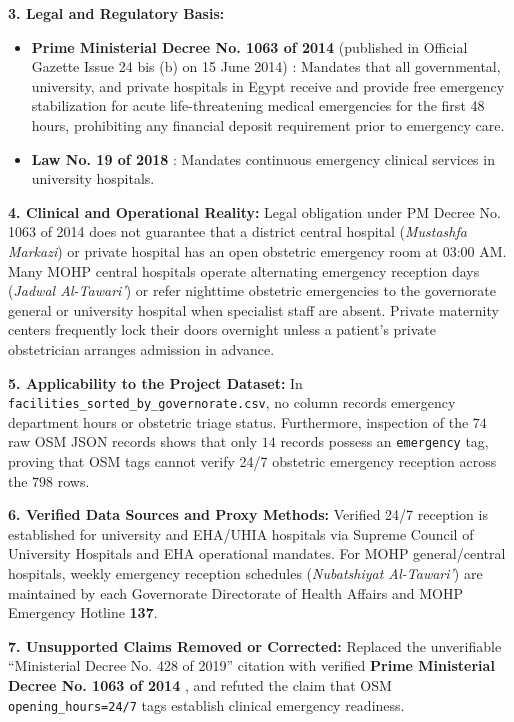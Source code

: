 \documentclass[10pt,a4paper]{article}
\begin{document}
\textbf{3. Legal and Regulatory Basis:}
\begin{itemize}
    \item \textbf{Prime Ministerial Decree No. 1063 of 2014} (published in Official Gazette Issue 24 bis (b) on 15 June 2014) \cite{egypt_pm_decree_1063_2014}: Mandates that all governmental, university, and private hospitals in Egypt receive and provide free emergency stabilization for acute life-threatening medical emergencies for the first 48 hours, prohibiting any financial deposit requirement prior to emergency care.
    \item \textbf{Law No. 19 of 2018} \cite{egypt_law_19_2018_univ}: Mandates continuous emergency clinical services in university hospitals.
\end{itemize}

\textbf{4. Clinical and Operational Reality:}
Legal obligation under PM Decree No. 1063 of 2014 does not guarantee that a district central hospital (\textit{Mustashfa Markazi}) or private hospital has an open obstetric emergency room at 03:00 AM. Many MOHP central hospitals operate alternating emergency reception days (\textit{Jadwal Al-Tawari'}) or refer nighttime obstetric emergencies to the governorate general or university hospital when specialist staff are absent. Private maternity centers frequently lock their doors overnight unless a patient's private obstetrician arranges admission in advance.

\textbf{5. Applicability to the Project Dataset:}
In \texttt{facilities\_sorted\_by\_governorate.csv}, no column records emergency department hours or obstetric triage status. Furthermore, inspection of the $74$ raw OSM JSON records shows that only $14$ records possess an \texttt{emergency} tag, proving that OSM tags cannot verify 24/7 obstetric emergency reception across the $798$ rows.

\textbf{6. Verified Data Sources and Proxy Methods:}
Verified 24/7 reception is established for university and EHA/UHIA hospitals via Supreme Council of University Hospitals and EHA operational mandates. For MOHP general/central hospitals, weekly emergency reception schedules (\textit{Nubatshiyat Al-Tawari'}) are maintained by each Governorate Directorate of Health Affairs and MOHP Emergency Hotline \textbf{137}.

\textbf{7. Unsupported Claims Removed or Corrected:}
Replaced the unverifiable ``Ministerial Decree No. 428 of 2019'' citation with verified \textbf{Prime Ministerial Decree No. 1063 of 2014} \cite{egypt_pm_decree_1063_2014}, and refuted the claim that OSM \texttt{opening\_hours=24/7} tags establish clinical emergency readiness.
\end{document}

